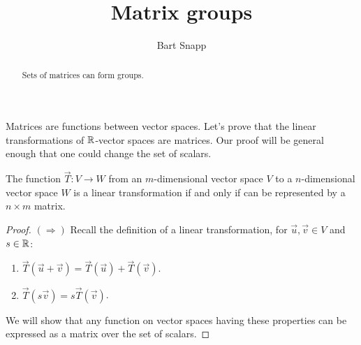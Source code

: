 \documentclass{ximera}
\author{Bart Snapp}
\title{Matrix groups}
\begin{document}
\begin{abstract}
  Sets of matrices can form groups.
\end{abstract}
\maketitle

Matrices are functions between vector spaces. Let's prove that the
linear transformations of $\mathbb R$-vector spaces are matrices. Our proof
will be general enough that one could change the set of scalars.

\begin{lemma}
  The function $\vec{T}: V \to W$ from an $m$-dimensional vector space
  $V$ to a $n$-dimensional vector space $W$ is a linear transformation
  if and only if can be represented by a $n\times m$ matrix.
  \begin{proof}
    $(\Rightarrow)$ Recall the definition of a linear transformation,
    for $\vec{u},\vec{v}\in V$ and $s\in \mathbb R$:
    \begin{enumerate}
    \item $\vec{T}(\vec{u}+\vec{v}) = \vec{T}(\vec{u})+\vec{T}(\vec{v})$.
    \item $\vec{T}(s \vec{v}) = s\vec{T}(\vec{v})$.
    \end{enumerate}
    We will show that any function on vector spaces having these
    properties can be expressed as a matrix over the set of scalars.


\end{proof}
\end{lemma}
\end{document}
